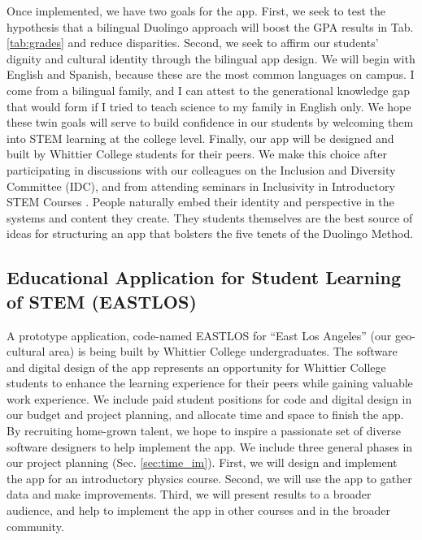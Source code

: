 \documentclass[11pt]{amsart}
\begin{document}
Once implemented, we have two goals for the app.  First, we seek to test the hypothesis that a bilingual Duolingo approach will boost the GPA results in Tab. \ref{tab:grades} and reduce disparities.  Second, we seek to affirm our students' dignity and cultural identity through the bilingual app design.  We will begin with English and Spanish, because these are the most common languages on campus.  I come from a bilingual family, and I can attest to the generational knowledge gap that would form if I tried to teach science to my family in English only.  We hope these twin goals will serve to build confidence in our students by welcoming them into STEM learning at the college level.  Finally, our app will be designed and built by Whittier College students for their peers.  We make this choice after participating in discussions with our colleagues on the Inclusion and Diversity Committee (IDC), and from attending seminars in Inclusivity in Introductory STEM Courses \cite{cottrell1,cottrell2}.  People naturally embed their identity and perspective in the systems and content they create.  They students themselves are the best source of ideas for structuring an app that bolsters the five tenets of the Duolingo Method.  

\subsection{Educational Application for Student Learning of STEM (EASTLOS)}

A prototype application, code-named EASTLOS for ``East Los Angeles'' (our geo-cultural area) is being built by Whittier College undergraduates.  The software and digital design of the app represents an opportunity for Whittier College students to enhance the learning experience for their peers while gaining valuable work experience.  We include paid student positions for code and digital design in our budget and project planning, and allocate time and space to finish the app.  By recruiting home-grown talent, we hope to inspire a passionate set of diverse software designers to help implement the app.  We include three general phases in our project planning (Sec. \ref{sec:time_im}).  First, we will design and implement the app for an introductory physics course.  Second, we will use the app to gather data and make improvements.  Third, we will present results to a broader audience, and help to implement the app in other courses and in the broader community. 
\end{document}
